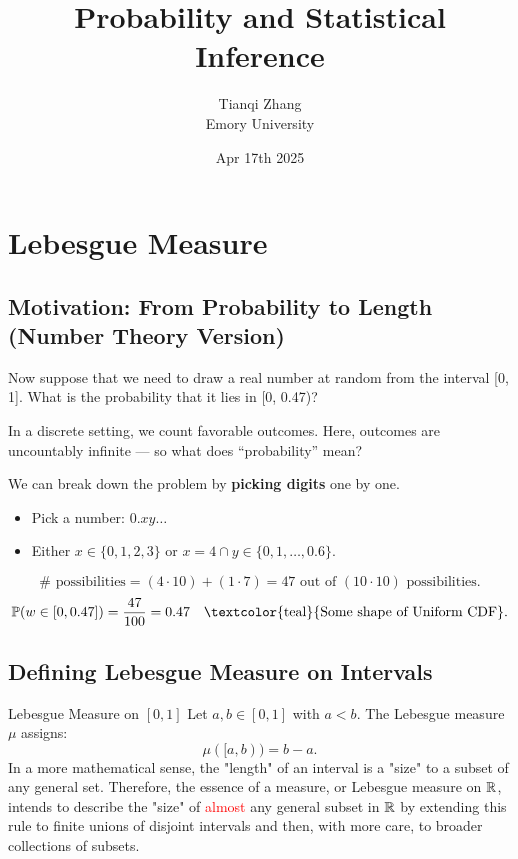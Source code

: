 

\title{\textbf{%
               Probability and Statistical Inference}}
\author{Tianqi Zhang\\
Emory University}
\date{Apr 17th 2025}


\maketitle
\setcounter{tocdepth}{1} %

\setcounter{section}{3}
\section{Lebesgue Measure}
\subsection{Motivation: From Probability to Length (Number Theory Version)}
Now suppose that we need to draw a real number at random from the interval [0, 1]. What is the probability that it lies in [0, 0.47)?

In a discrete setting, we count favorable outcomes. Here, outcomes are uncountably infinite — so what does “probability” mean?

We can break down the problem by \textbf{picking digits} one by one. 
\begin{itemize}
    \item Pick a number: \(0.xy\ldots\)
    \item Either \(x \in \{0,1,2,3\}\) or \(x = 4 \cap y \in \{0, 1, \ldots, 0.6\}\).
\end{itemize}
\[
\#\text{ possibilities} = (4 \cdot 10) + (1 \cdot 7) = 47 \text{ out of } (10 \cdot 10) \text{ possibilities}.
\]
\[
\mathbb{P}(w \in [0,0.47]) = \frac{47}{100} = 0.47 \quad \text{\textcolor{teal}{Some shape of Uniform CDF}}.
\]

\subsection{Defining Lebesgue Measure on Intervals}
\begin{df}{Lebesgue Measure on \([0, 1]\)}
Let \( a, b \in [0, 1] \) with \( a < b \). The Lebesgue measure \( \mu \) assigns:
\[
\mu([a, b)) = b - a.
\]
In a more mathematical sense, the "length" of an interval is a "size" to a subset of any general set. Therefore, the essence of a measure, or Lebesgue measure on ${\mathbb{R}}$, intends to describe the "size" of \textcolor{red}{almost} any general subset in ${\mathbb{R}}$ by extending this rule to finite unions of disjoint intervals and then, with more care, to broader collections of subsets.
\end{df}


